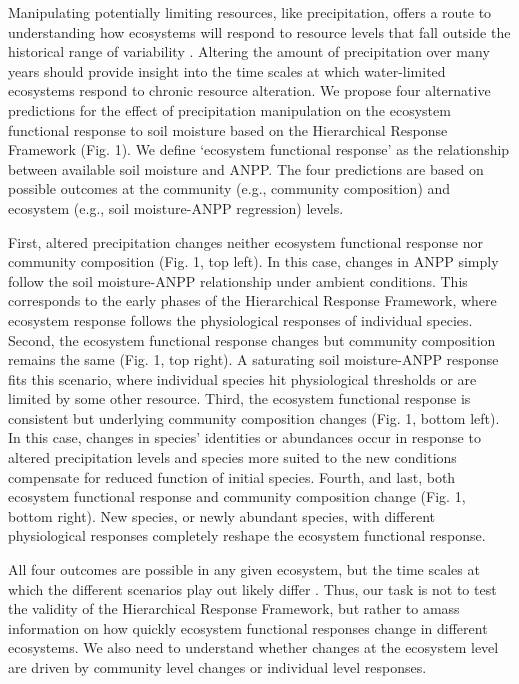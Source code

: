 \documentclass[fleqn,10pt,lineno]{wlpeerj} %
\begin{document}
Manipulating potentially limiting resources, like precipitation, offers
a route to understanding how ecosystems will respond to resource levels
that fall outside the historical range of variability
\citep{Avolio2015, Gherardi2015, Knapp2017}. Altering the amount of
precipitation over many years should provide insight into the time
scales at which water-limited ecosystems respond to chronic resource
alteration. We propose four alternative predictions for the effect of
precipitation manipulation on the ecosystem functional response to soil
moisture based on the Hierarchical Response Framework (Fig. 1). We
define `ecosystem functional response' as the relationship between
available soil moisture and ANPP. The four predictions are based on
possible outcomes at the community (e.g., community composition) and
ecosystem (e.g., soil moisture-ANPP regression) levels.

First, altered precipitation changes neither ecosystem functional
response nor community composition (Fig. 1, top left). In this case,
changes in ANPP simply follow the soil moisture-ANPP relationship under
ambient conditions. This corresponds to the early phases of the
Hierarchical Response Framework, where ecosystem response follows the
physiological responses of individual species. Second, the ecosystem
functional response changes but community composition remains the same
(Fig. 1, top right). A saturating soil moisture-ANPP response fits this
scenario, where individual species hit physiological thresholds or are
limited by some other resource. Third, the ecosystem functional response
is consistent but underlying community composition changes (Fig. 1,
bottom left). In this case, changes in species' identities or abundances
occur in response to altered precipitation levels and species more
suited to the new conditions compensate for reduced function of initial
species. Fourth, and last, both ecosystem functional response and
community composition change (Fig. 1, bottom right). New species, or
newly abundant species, with different physiological responses
completely reshape the ecosystem functional response.

All four outcomes are possible in any given ecosystem, but the time
scales at which the different scenarios play out likely differ
\citep{Smith2009, Wilcox2016, Knapp2017}. Thus, our task is not to test
the validity of the Hierarchical Response Framework, but rather to amass
information on how quickly ecosystem functional responses change in
different ecosystems. We also need to understand whether changes at the
ecosystem level are driven by community level changes or individual
level responses.
\end{document}

